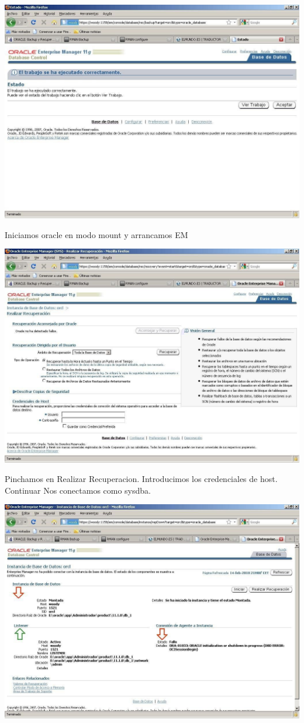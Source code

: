 \begin{enumerate}[1.]
\begin{center}
\includegraphics[width=15cm]{./Imagenes/eje5}
\end{center}
Iniciamos oracle en modo mount y arrancamos EM
\begin{center}
\includegraphics[width=15cm]{./Imagenes/eje6}
\end{center}
Pinchamos en Realizar Recuperacion. Introducimos los credenciales de host. Continuar Nos conectamos como sysdba.
\begin{center}
\includegraphics[width=15cm]{./Imagenes/eje7}

\end{center}
\end{enumerate}
